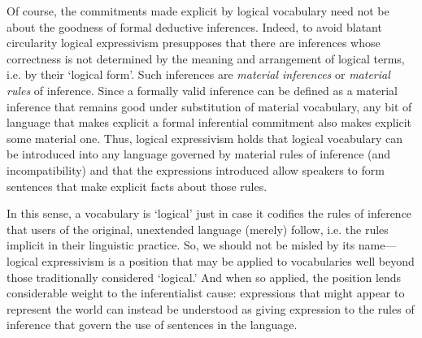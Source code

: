 \documentclass{article}
\begin{document}
Of course, the commitments made explicit by logical vocabulary need not be about the goodness of formal deductive inferences. Indeed, to avoid blatant circularity logical expressivism presupposes that there are inferences whose correctness is not determined by the meaning and arrangement of logical terms, i.e. by their `logical form'. Such inferences are \textit{material inferences} or \textit{material rules} of inference.  Since a formally valid inference can be defined as a material inference that remains good under substitution of material vocabulary, any bit of language that makes explicit a formal inferential commitment also makes explicit some material one. Thus, logical expressivism holds that logical vocabulary can be introduced into any language governed by material rules of inference (and incompatibility) and that the expressions introduced allow speakers to form sentences that make explicit facts about those rules.

In this sense, a vocabulary is `logical' just in case it codifies the rules of inference that users of the original, unextended language (merely) follow, i.e. the rules implicit in their linguistic practice.  So, we should not be misled by its name---logical expressivism is a position that may be applied to vocabularies well beyond those traditionally considered `logical.' And when so applied, the position lends considerable weight to the inferentialist cause: expressions that might appear to represent the world can instead be understood as giving expression to the rules of inference that govern the use of sentences in the language.  


\end{document}
